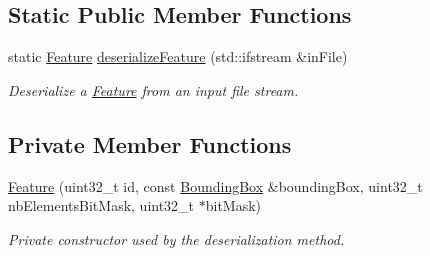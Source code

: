 \subsection*{Static Public Member Functions}
\begin{DoxyCompactItemize}
\item 
static \hyperlink{classfc_1_1Feature}{Feature} \hyperlink{classfc_1_1Feature_a6ea5b6e3e6d14f29a6faa9b4464f8d4b}{deserialize\+Feature} (std\+::ifstream \&in\+File)
\begin{DoxyCompactList}\small\item\em Deserialize a \hyperlink{classfc_1_1Feature}{Feature} from an input file stream. \end{DoxyCompactList}\end{DoxyCompactItemize}
\subsection*{Private Member Functions}
\begin{DoxyCompactItemize}
\item 
\hyperlink{classfc_1_1Feature_ac61c6f20533da3d4d4b3ee03f4976278}{Feature} (uint32\+\_\+t id, const \hyperlink{classfc_1_1BoundingBox}{Bounding\+Box} \&bounding\+Box, uint32\+\_\+t nb\+Elements\+Bit\+Mask, uint32\+\_\+t $\ast$bit\+Mask)
\begin{DoxyCompactList}\small\item\em Private constructor used by the deserialization method. \end{DoxyCompactList}\end{DoxyCompactItemize}
